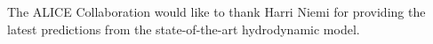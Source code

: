 The ALICE Collaboration would like to thank Harri Niemi for providing the latest predictions from the state-of-the-art hydrodynamic model.
